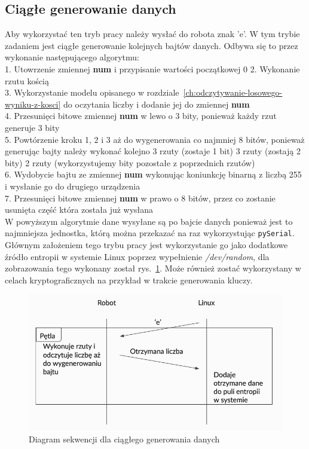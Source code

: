 \subsection{Ciągłe generowanie danych}
Aby wykorzystać ten tryb pracy należy wysłać do robota znak 'e'.
W tym trybie zadaniem jest ciągłe generowanie kolejnych bajtów danych.
Odbywa się to przez wykonanie następującego algorytmu:\\
1. Utowrzenie zmiennej \textbf{num} i przypisanie wartości początkowej 0
2. Wykonanie rzutu kością \\
3. Wykorzystanie modelu opisanego w rozdziale~\ref{ch:odczytywanie-losowego-wyniku-z-kosci} do oczytania liczby i dodanie jej do zmiennej \textbf{num} \\
4. Przesunięci bitowe zmiennej \textbf{num} w lewo o 3 bity, ponieważ każdy rzut generuje 3 bity \\
5. Powtórzenie kroku 1, 2 i 3 aż do wygenerowania co najmniej 8 bitów, ponieważ generując bajty należy wykonać 
kolejno 3 rzuty (zostaje 1 bit) 3 rzuty (zostają 2 bity) 2 rzuty (wykorzystujemy bity pozostałe z poprzednich rzutów) \\
6. Wydobycie bajtu ze zmiennej \textbf{num} wykonując koniunkcję binarną z liczbą 255 i wysłanie go do drugiego urządzenia \\
7. Przesunięci bitowe zmiennej \textbf{num} w prawo o 8 bitów, przez co zostanie usunięta część która została już wysłana \\ 

W powyższym algorytmie dane wysyłane są po bajcie danych ponieważ jest to najmniejsza jednostka, 
którą można przekazać na raz wykorzystując \texttt{pySerial}.
Głównym założeniem tego trybu pracy jest wykorzystanie go jako dodatkowe źródło entropii w systemie 
Linux poprzez wypełnienie \textit{/dev/random}, dla zobrazowania tego wykonany został rys.~\ref{fig:interface_a}. Może również zostać wykorzystany w celach 
kryptograficznych na przykład w trakcie generowania kluczy.

\begin{figure}[H]
    \centering
    \includegraphics[width=0.5\linewidth]{chapters/05-Przetwarzanie Wyniku/figures/InterfaceA}
    \caption{Diagram sekwencji dla ciągłego generowania danych}
    \label{fig:interface_a}
\end{figure}

